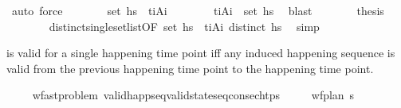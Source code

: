 \begin{isabellebody}
\ auto\ force\isanewline
\ \ \ \ \isamarkupfalse%
\ \isamarkupfalse%
\ {\isachardoublequoteopen}set\ {\isacharquery}{\kern0pt}hs{\isacharprime}{\kern0pt}\ {\isacharequal}{\kern0pt}\ {\isacharbraceleft}{\kern0pt}{\isacharparenleft}{\kern0pt}t\isactrlsub i{\isacharcomma}{\kern0pt}A\isactrlsub i{\isacharparenright}{\kern0pt}{\isacharbraceright}{\kern0pt}{\isachardoublequoteclose}\isanewline
\ \ \ \ \ \ \isamarkupfalse%
\ {\isacartoucheopen}{\isacharparenleft}{\kern0pt}t\isactrlsub i{\isacharcomma}{\kern0pt}A\isactrlsub i{\isacharparenright}{\kern0pt}\ {\isasymin}\ set\ {\isacharquery}{\kern0pt}hs{\isacharprime}{\kern0pt}{\isacartoucheclose}\ \isamarkupfalse%
\ blast\isanewline
\ \ \ \ \isamarkupfalse%
\ \isamarkupfalse%
\ {\isacharquery}{\kern0pt}thesis\isanewline
\ \ \ \ \ \ \isamarkupfalse%
\ distinct{\isacharunderscore}{\kern0pt}single{\isacharunderscore}{\kern0pt}set{\isacharunderscore}{\kern0pt}list{\isacharbrackleft}{\kern0pt}OF\ {\isacartoucheopen}set\ {\isacharquery}{\kern0pt}hs{\isacharprime}{\kern0pt}\ {\isacharequal}{\kern0pt}\ {\isacharbraceleft}{\kern0pt}{\isacharparenleft}{\kern0pt}t\isactrlsub i{\isacharcomma}{\kern0pt}A\isactrlsub i{\isacharparenright}{\kern0pt}{\isacharbraceright}{\kern0pt}{\isacartoucheclose}\ {\isacartoucheopen}distinct\ {\isacharquery}{\kern0pt}hs{\isacharprime}{\kern0pt}{\isacartoucheclose}{\isacharbrackright}{\kern0pt}\ \isamarkupfalse%
\ simp\isanewline
\ \ \isamarkupfalse%
%
\endisatagproof
{\isafoldproof}%
%
\isadelimproof
%
\endisadelimproof
%
\begin{isamarkuptext}%
 is valid for a single happening time point iff any 
  induced happening sequence is valid from the previous happening time point to the 
  happening time point.%
\end{isamarkuptext}\isamarkuptrue%
\ \ \isamarkupfalse%
\ {\isacharparenleft}{\kern0pt}\ wf{\isacharunderscore}{\kern0pt}ast{\isacharunderscore}{\kern0pt}problem{\isacharparenright}{\kern0pt}\ valid{\isacharunderscore}{\kern0pt}happ{\isacharunderscore}{\kern0pt}seq{\isacharunderscore}{\kern0pt}valid{\isacharunderscore}{\kern0pt}state{\isacharunderscore}{\kern0pt}seq{\isacharunderscore}{\kern0pt}consec{\isacharunderscore}{\kern0pt}htps{\isacharcolon}{\kern0pt}\isanewline
\ \ \ \ \ {\isachardoublequoteopen}wf{\isacharunderscore}{\kern0pt}plan\ {\isasympi}s{\isachardoublequoteclose}\isanewline

\end{isabellebody}
